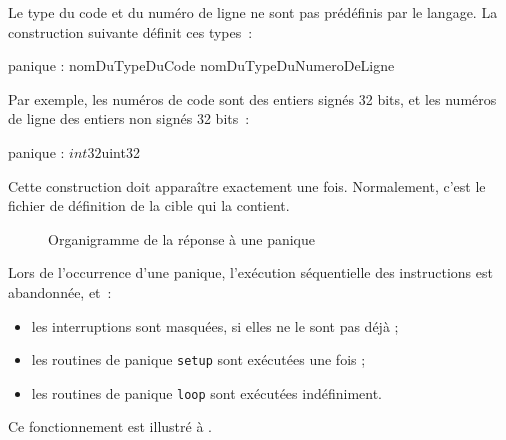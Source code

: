 Le type du code et du numéro de ligne ne sont pas prédéfinis par le langage. La construction suivante définit ces types~:
\begin{PLM}
panique : nomDuTypeDuCode nomDuTypeDuNumeroDeLigne
\end{PLM}

Par exemple, les numéros de code sont des entiers signés 32 bits, et les numéros de ligne des entiers non signés 32 bits~:
\begin{PLM}
panique : $int32 $uint32
\end{PLM}

Cette construction doit apparaître exactement une fois. Normalement, c'est le fichier de définition de la cible qui la contient.



\begin{figure}[t]
  \centering
  \small
  \caption{Organigramme de la réponse à une panique}
  \ligne
\end{figure}

Lors de l'occurrence d'une panique, l'exécution séquentielle des instructions est abandonnée, et~:
\begin{itemize}
  \item les interruptions sont masquées, si elles ne le sont pas déjà ;
  \item les routines de panique \texttt{setup} sont exécutées une fois ;
  \item les routines de panique \texttt{loop} sont exécutées indéfiniment.
\end{itemize}
Ce fonctionnement est illustré à .

